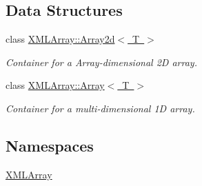 \subsection*{Data Structures}
\begin{DoxyCompactItemize}
\item 
class \mbox{\hyperlink{classXMLArray_1_1Array2d}{X\+M\+L\+Array\+::\+Array2d$<$ T $>$}}
\begin{DoxyCompactList}\small\item\em Container for a Array-\/dimensional 2D array. \end{DoxyCompactList}\item 
class \mbox{\hyperlink{classXMLArray_1_1Array}{X\+M\+L\+Array\+::\+Array$<$ T $>$}}
\begin{DoxyCompactList}\small\item\em Container for a multi-\/dimensional 1D array. \end{DoxyCompactList}\end{DoxyCompactItemize}
\subsection*{Namespaces}
\begin{DoxyCompactItemize}
\item 
 \mbox{\hyperlink{namespaceXMLArray}{X\+M\+L\+Array}}
\end{DoxyCompactItemize}
